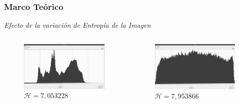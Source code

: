 \documentclass[usenames,dvipsnames]{beamer}
\begin{document}
\begin{frame} 
\frametitle{Marco Teórico} 
\begin{exampleblock}{\textit{Efecto de la variación de Entropía de la Imagen}}

\end{exampleblock}

\centering
\begin{columns}[onlytextwidth]
\begin{column}{.50\textwidth}
\begin{figure}
  \includegraphics[width=\textwidth]{graphics/peppers_gray_lc_hist.jpg}
  \caption{$\mathscr{H}=7,053228$}
\end{figure}
\end{column}
\hfill
\begin{column}{.50\textwidth}
		\begin{figure}
		  \includegraphics[width=\textwidth]{graphics/peppers_gray_hc_hist.jpg}
		  \caption{$\mathscr{H}=7,953866$}
		\end{figure}
\end{column}
\end{columns}

\end{frame}
\end{document}
